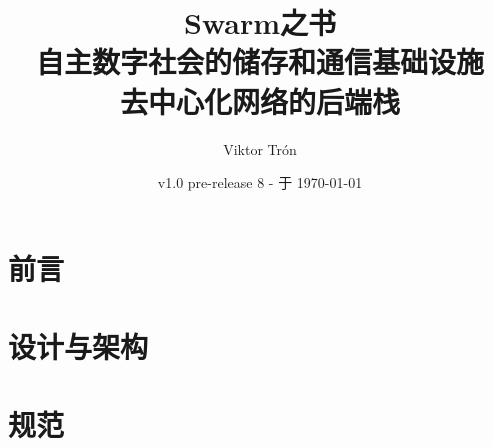 \documentclass[a4paper,12pt,openany,hyperfootnotes,hidelinks]{scrbook}
\title{\Huge\sc Swarm之书\\
\Large 自主数字社会的储存和通信基础设施\\
去中心化网络的后端栈}
\author{Viktor Trón}
\date{v1.0 pre-release 8 - 于 \today}
\newif\ifdraft
\begin{document}
\frontmatter
\maketitle
\setcounter{tocdepth}{2}


\ifdraft
编译和分发的说明。

如果不显示条件文本(在发布版本时)，则隐藏这些选项。

\begin{enumerate}
    \item 任何正在工作的版本应该被命名为“版本vX -工作”;
    \item 在出版时，“曾工作过”应删除; 
    \item Drafttrue line应该注释掉，在编译时删除条件文本;
    \item PDF应该生成，保存和推到Github repo \\ (https://github.com/ethersphere/publish-bookofswarm/tree/master/pdfs); \item 验证上次提交是自动部署到Swarm \\ (https://Swarm-gateways.net/bzz:/latest.bookofswarm.eth/the-book-of-Swarm-viktor-tron.pdf);
    \item 在Github repo中的PDF提交应该以版本号命名;
    \item Latex中的版本号应该被提升，“已完成”注释添加:“版本v(X+1) -已完成”;
    \item 转到1。
\end{enumerate}
\fi


\tableofcontents
\listoffigures

\label{sec:toc}
 
\mainmatter
\part{前言} \label{part:preface}

\part{设计与架构} \label{part:designarchitecture}

\part{规范}
\label{part:specifications}

{}

\appendix
\end{document}
